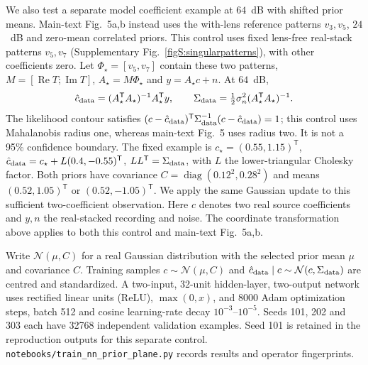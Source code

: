 \documentclass[pdflatex,sn-nature]{sn-jnl}%
\begin{document}
We also test a separate model coefficient example at $64$~dB with shifted prior means. Main-text Fig.~5a,b instead uses the with-lens reference patterns $v_3,v_5$, $24$~dB and zero-mean correlated priors. This control uses fixed lens-free real-stack patterns $v_5,v_7$
(Supplementary Fig.~\ref{figS:singularpatterns}), with other coefficients zero.
Let $\Phi_\star=[v_5,v_7]$ contain these two patterns, $M=[\operatorname{Re}T;\operatorname{Im}T]$,
$A_\star=M\Phi_\star$ and $y=A_\star c+n$. At $64$~dB,
\[
 \hat c_{\rm data}=(A_\star^{\mathsf T}A_\star)^{-1}A_\star^{\mathsf T}y,
 \qquad \Sigma_{\rm data}=\tfrac12\sigma_n^2(A_\star^{\mathsf T}A_\star)^{-1}.
\]
The likelihood contour satisfies
$(c-\hat c_{\rm data})^{\mathsf T}\Sigma_{\rm data}^{-1}(c-\hat c_{\rm data})=1$;
this control uses Mahalanobis radius one, whereas main-text Fig.~5 uses radius two. It is not a 95\% confidence boundary.
The fixed example is $c_\star=(0.55,1.15)^{\mathsf T}$,
$\hat c_{\rm data}=c_\star+L(0.4,-0.55)^{\mathsf T}$,
$LL^{\mathsf T}=\Sigma_{\rm data}$, with $L$ the lower-triangular Cholesky factor.
Both priors have covariance $C=\operatorname{diag}(0.12^2,0.28^2)$ and means
$(0.52,1.05)^{\mathsf T}$ or $(0.52,-1.05)^{\mathsf T}$.
We apply the same Gaussian update to this sufficient two-coefficient observation.
Here $c$ denotes two real source coefficients and $y,n$ the real-stacked
recording and noise. The coordinate transformation above applies to both this control and main-text Fig.~5a,b.

Write $\mathcal N(\mu,C)$ for a real Gaussian distribution with the selected prior mean $\mu$ and covariance $C$. Training samples $c\sim\mathcal N(\mu,C)$ and
$\hat c_{\rm data}\mid c\sim\mathcal N(c,\Sigma_{\rm data})$ are centred
and standardized. A two-input, 32-unit hidden-layer, two-output network
uses rectified linear units (ReLU), $\max(0,x)$, and 8000 Adam optimization
steps, batch 512 and cosine learning-rate decay $10^{-3}$--$10^{-5}$.
Seeds 101, 202 and 303 each have 32768 independent validation examples.
Seed 101 is retained in the reproduction outputs for this separate control.
\texttt{notebooks/train\_nn\_prior\_plane.py} records results and operator fingerprints.
\end{document}
